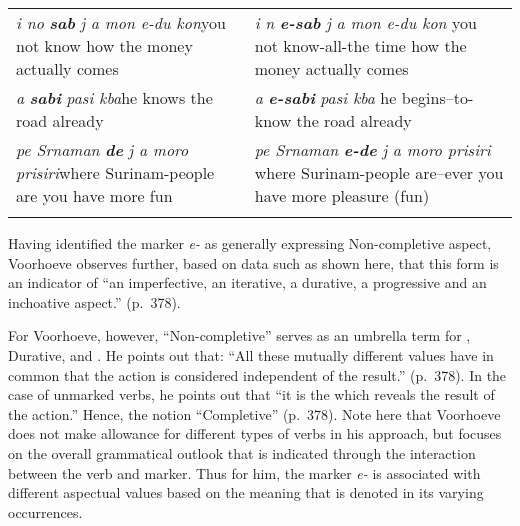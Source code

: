 \begin{table}[t]
\begin{tabularx}{\textwidth}{QQ}
    \tablevspace \textit{i no} \textbf{\textit{sab}} \textit{j a mon
      e-du kon}\newline you not know how the money actually comes &
    \textit{i n} \textbf{\textit{e-sab}} \textit{j a mon e-du
      kon}\newline
    you not know-all-the time how the money actually    comes\\

    \tablevspace \textit{a} \textbf{\textit{sabi}} \textit{pasi
      kba}\newline he knows the road already & \textit{a}
    \textbf{\textit{e-sabi}} \textit{pasi kba}\newline
    he begins–to-know the road already \\

    \tablevspace \textit{pe Srnaman} \textbf{\textit{de}} \textit{j a
      moro prisiri}\newline where Surinam-people are you have more fun
    & \textit{pe Srnaman} \textbf{\textit{e-de}} \textit{j a moro
      prisiri}\newline
    where Surinam-people are–ever you have more pleasure (fun)\\
    \lspbottomrule
  \end{tabularx}
\end{table}

Having identified the marker \textit{e-} as generally expressing
Non-completive aspect, Voorhoeve observes further, based on data such
as shown here, that this form is an indicator of ``an imperfective, an
iterative, a durative, a progressive and an inchoative aspect.”
(p.~378).

For Voorhoeve, however, ``Non-completive'' serves as an umbrella
term for , Durative,  and .  He
points out that: ``All these mutually different values have in common
that the action is considered independent of the result.” (p.~378).
In the case of unmarked verbs, he points out that ``it is the
 which reveals the result of the action.”  Hence, the
notion ``Completive'' (p.~378).  Note here that Voorhoeve does
not make allowance for different types of verbs in his approach, but
focuses on the overall grammatical outlook that is indicated through
the interaction between the verb and marker.  Thus for him, the marker
\textit{e-} is associated with different aspectual values based on the
meaning that is denoted in its varying occurrences.

